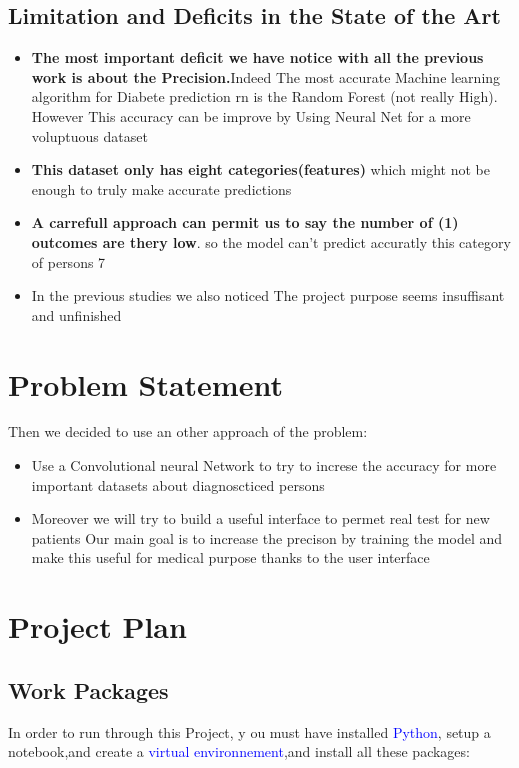 \documentclass[rnd]{mas_proposal}
\begin{document}
\subsection{Limitation and Deficits in the State of the Art}
\begin{itemize}
    \item \textbf{The most important deficit we have notice with all the previous work is about the Precision.}Indeed The most accurate Machine learning algorithm for Diabete prediction rn is the Random Forest (not really High).
    However This accuracy can be improve by Using Neural Net for a more voluptuous dataset
    \item \textbf{This dataset only has eight categories(features) } which might not be enough to truly make accurate predictions
   \item \textbf{A carrefull approach can permit us to say the number of (1) outcomes are thery
low}. so the model can’t predict accuratly this category of persons
7
\item In the previous studies we also noticed The project purpose seems insuffisant and unfinished 
\end{itemize}

\section{Problem Statement}
Then we decided to use an other approach of the problem:
\begin{itemize}
    \item Use a Convolutional neural Network to try to increse the accuracy for more important datasets about diagnoscticed persons
    \item Moreover we will try to build a useful interface to permet real test for new patients
Our main goal is to increase the precison by training the model and make this useful for medical purpose thanks to the user interface
\end{itemize}

\section{Project Plan}

\subsection{Work Packages}
In order to run through this Project, y
ou must have installed \textcolor{blue}{Python},
setup a notebook,and create a  \textcolor{blue}{virtual environnement},and install
  all these packages:
\end{document}
